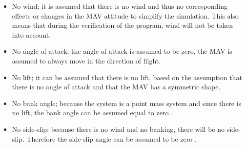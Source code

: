 \begin{itemize}
\item No wind; it is assumed that there is no wind and thus no corresponding effects or changes in the \ac{MAV} attitude to simplify the simulation. This also means that during the verification of the program, wind will not be taken into account.
\item No angle of attack; the angle of attack is assumed to be zero, the \ac{MAV} is assumed to always move in the direction of flight. 
\item No lift; it can be assumed that there is no lift, based on the assumption that there is no angle of attack and that the \ac{MAV} has a symmetric shape.
\item No bank angle; because the system is a point mass system and since there is no lift, the bank angle can be assumed equal to zero \cite{kesteren2013air}.
\item No side-slip; because there is no wind and no banking, there will be no side-slip. Therefore the side-slip angle can be assumed to be zero \cite{mooij1994motion}.


\end{itemize}


